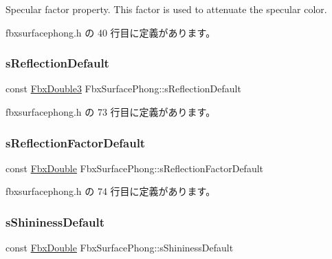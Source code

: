 Specular factor property. This factor is used to attenuate the specular color. 

 fbxsurfacephong.\+h の 40 行目に定義があります。

\mbox{\label{class_fbx_surface_phong_a0513a220ce6a0cc31124637008b637bc}} 
\subsubsection{\texorpdfstring{s\+Reflection\+Default}{sReflectionDefault}}
{\footnotesize\ttfamily const \hyperlink{fbxtypes_8h_ae0a96f14cde566774c7553aa7523b7a7}{Fbx\+Double3} Fbx\+Surface\+Phong\+::s\+Reflection\+Default\hspace{0.3cm}{\ttfamily [static]}}



 fbxsurfacephong.\+h の 73 行目に定義があります。

\mbox{\label{class_fbx_surface_phong_a7fa1d3af6e4814d255726194b6ebb968}} 
\subsubsection{\texorpdfstring{s\+Reflection\+Factor\+Default}{sReflectionFactorDefault}}
{\footnotesize\ttfamily const \hyperlink{fbxtypes_8h_a171e72a1c46fc15c1a6c9c31948c1c5b}{Fbx\+Double} Fbx\+Surface\+Phong\+::s\+Reflection\+Factor\+Default\hspace{0.3cm}{\ttfamily [static]}}



 fbxsurfacephong.\+h の 74 行目に定義があります。

\mbox{\label{class_fbx_surface_phong_ad73d54cca213c728a5c5e88e74cf9bd3}} 
\subsubsection{\texorpdfstring{s\+Shininess\+Default}{sShininessDefault}}
{\footnotesize\ttfamily const \hyperlink{fbxtypes_8h_a171e72a1c46fc15c1a6c9c31948c1c5b}{Fbx\+Double} Fbx\+Surface\+Phong\+::s\+Shininess\+Default\hspace{0.3cm}{\ttfamily [static]}}



